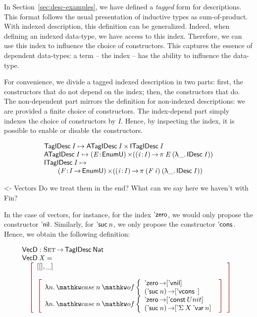 In Section~\ref{sec:desc-examples}, we have defined a \emph{tagged}
form for descriptions. This format follows the usual presentation of
inductive types as sum-of-product. With indexed description, this
definition can be generalized. Indeed, when defining an indexed
data-type, we have access to this index. Therefore, we can use this
index to influence the choice of constructors. This captures the
essence of dependent data-types: a term -- the index -- has the
ability to influence the data-type.

For convenience, we divide a tagged indexed description in two parts:
first, the constructors that do not depend on the index; then, the
constructors that do. The non-dependent part mirrors the definition
for non-indexed descriptions: we are provided a finite choice of
constructors. The index-depend part simply indexes the choice of
constructors by $I$. Hence, by inspecting the index, it is possible to
enable or disable the constructors. 

\[\stk{
 \TagIDesc{\V{I}}  \mapsto \TIMES{\ATagIDesc{\V{I}}}{\ITagIDesc{\V{I}}} \\
 \ATagIDesc{\V{I}} \mapsto \SIGMA{\V{E}}{\EnumU} (\PI{\V{i}}{\V{I}} \spi{\V{E}}{(\LAM{\_} \IDesc{\V{I}})}) \\
 \ITagIDesc{\V{I}} \mapsto \\
\qquad\SIGMA{\V{F}}{\V{I} \To \EnumU} (\PI{\V{i}}{\V{I}} \spi{(\V{F}\: \V{i})}{(\LAM{\_} \IDesc{\V{I}})}) 
}\]


\begin{wstructure}
<- Vectors
    Do we treat them in the end? 
    What can we say here we haven't with Fin?
\end{wstructure}

In the case of vectors, for instance, for the index $\NatZero$, we
would only propose the constructor $\ListNil$. Similarly, for
$\NatSuc{n}$, we only propose the constructor $\ListCons{\!}{\!}$. Hence,
we obtain the following definition:

\newcommand{\VecD}{\C{VecD}}
\newcommand{\VecNil}{\etag{\CN{vnil}}}
\newcommand{\VecCons}[2]{\etag{\CN{vcons}}\:#1\:#2}

\[\stk{
\VecD : \Set \To \TagIDesc{\Nat} \\
\begin{array}{@{}ll}
\VecD\: \V{X} = \\ \quad\bigRedBracket{ 
            \begin{array}{l}
                \pair{[]}{\_}{} 
                \\\\
                \bigRedBracket{
                \begin{array}{l} 
                  \LAM{n} \caseB{n}{\NatZero \To [\VecNil] \\
                                   (\NatSuc n) \To [\VecCons{}{}]} \\
                  \LAM{n} \caseB{n}{\NatZero \To [\DConst{Unit}] \\
                                   (\NatSuc n) \To [\DSigma{X}{\DVar{n}}]}
                \end{array}}
            \end{array}}
\end{array}
}\]


